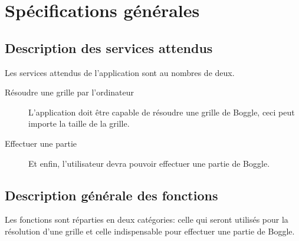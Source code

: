 \documentclass[12pt,a4paper,openany]{article}
\begin{document}
	\section{Spécifications générales}
	\subsection{Description des services attendus}
	Les services attendus de l'application sont au nombres de deux.
		\begin{description}
			\item[Résoudre une grille par l'ordinateur] L'application doit être capable de résoudre une grille de Boggle, ceci peut importe la taille de
				la grille.
			\item[Effectuer une partie]  Et enfin, l'utilisateur devra pouvoir effectuer une partie de Boggle.
		\end{description}
	\subsection{Description générale des fonctions}
	Les fonctions sont réparties en deux catégories: celle qui seront utilisés pour la résolution d'une grille et celle indispensable pour effectuer
	une partie de Boggle.
\end{document}
